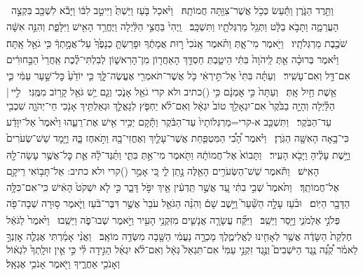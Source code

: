 \documentclass[12pt]{article}
\newcommand{\loc}[1]{\textsuperscript{\locf{#1}}}
\begin{document}
{\loc{ ו}~}‏וַתֵּ֖רֶד הַגֹּ֑רֶן וַתַּ֕עַשׂ כְּכֹ֥ל אֲשֶׁר־צִוַּ֖תָּה חֲמוֹתָֽהּ׃
{\loc{ ז}~}‏וַיֹּ֨אכַל בֹּ֤עַז וַיֵּשְׁתְּ֙ וַיִּיטַ֣ב לִבּ֔וֹ וַיָּבֹ֕א לִשְׁכַּ֖ב בִּקְצֵ֣ה הָעֲרֵמָ֑ה וַתָּבֹ֣א בַלָּ֔ט וַתְּגַ֥ל מַרְגְּלֹתָ֖יו וַתִּשְׁכָּֽב׃
{\loc{ ח}~}‏וַֽיְהִי֙ בַּחֲצִ֣י הַלַּ֔יְלָה וַיֶּחֱרַ֥ד הָאִ֖ישׁ וַיִּלָּפֵ֑ת וְהִנֵּ֣ה אִשָּׁ֔ה שֹׁכֶ֖בֶת מַרְגְּלֹתָֽיו׃
{\loc{ ט}~}‏וַיֹּ֖אמֶר מִי־אָ֑תְּ וַתֹּ֗אמֶר אָֽנֹכִי֙ ר֣וּת אֲמָתֶ֔ךָ וּפָרַשְׂתָּ֤ כְנָפֶ֙ךָ֙ עַל־אֲמָ֣תְךָ֔ כִּ֥י גֹאֵ֖ל אָֽתָּה׃
{\loc{ י}~}‏וַיֹּ֗אמֶר בְּרוּכָ֨ה אַ֤תְּ לַֽיהֹוָה֙ בִּתִּ֔י הֵיטַ֛בְתְּ חַסְדֵּ֥ךְ הָאַחֲר֖וֹן מִן־הָרִאשׁ֑וֹן לְבִלְתִּי־לֶ֗כֶת אַֽחֲרֵי֙ הַבַּ֣חוּרִ֔ים אִם־דַּ֖ל וְאִם־עָשִֽׁיר׃
{\loc{ יא}~}‏וְעַתָּ֗ה בִּתִּי֙ אַל־תִּ֣ירְאִ֔י כֹּ֥ל אֲשֶׁר־תֹּאמְרִ֖י אֶעֱשֶׂה־לָּ֑ךְ כִּ֤י יוֹדֵ֙עַ֙ כׇּל־שַׁ֣עַר עַמִּ֔י כִּ֛י אֵ֥שֶׁת חַ֖יִל אָֽתְּ׃
{\loc{ יב}~}‏וְעַתָּה֙ כִּ֣י אׇמְנָ֔ם כִּ֥י (){כתיב ולא קרי} גֹאֵ֖ל אָנֹ֑כִי וְגַ֛ם יֵ֥שׁ גֹּאֵ֖ל קָר֥וֹב מִמֶּֽנִּי׃
{\loc{ יג}~}‏לִ֣י{\Large }י |  הַלַּ֗יְלָה וְהָיָ֤ה בַבֹּ֙קֶר֙ אִם־יִגְאָלֵ֥ךְ טוֹב֙ יִגְאָ֔ל וְאִם־לֹ֨א יַחְפֹּ֧ץ לְגָאֳלֵ֛ךְ וּגְאַלְתִּ֥יךְ אָנֹ֖כִי חַי־יְהֹוָ֑ה שִׁכְבִ֖י עַד־הַבֹּֽקֶר׃
{\loc{ יד}~}‏וַתִּשְׁכַּ֤ב א-קרי=מַרְגְּלוֹתָיו֙ עַד־הַבֹּ֔קֶר וַתָּ֕קׇם  יַכִּ֥יר אִ֖ישׁ אֶת־רֵעֵ֑הוּ וַיֹּ֙אמֶר֙ אַל־יִוָּדַ֔ע כִּי־בָ֥אָה הָאִשָּׁ֖ה הַגֹּֽרֶן׃
{\loc{ טו}~}‏וַיֹּ֗אמֶר הָ֠בִ֠י הַמִּטְפַּ֧חַת אֲשֶׁר־עָלַ֛יִךְ וְאֶחֳזִי־בָ֖הּ וַתֹּ֣אחֶז בָּ֑הּ וַיָּ֤מׇד שֵׁשׁ־שְׂעֹרִים֙ וַיָּ֣שֶׁת עָלֶ֔יהָ וַיָּבֹ֖א הָעִֽיר׃
{\loc{ טז}~}‏וַתָּבוֹא֙ אֶל־חֲמוֹתָ֔הּ וַתֹּ֖אמֶר מִי־אַ֣תְּ בִּתִּ֑י וַתַּ֨גֶּד־לָ֔הּ אֵ֛ת כׇּל־אֲשֶׁ֥ר עָשָׂה־לָ֖הּ הָאִֽישׁ׃
{\loc{ יז}~}‏וַתֹּ֕אמֶר שֵׁשׁ־הַשְּׂעֹרִ֥ים הָאֵ֖לֶּה נָ֣תַן לִ֑י כִּ֚י אָמַ֣ר (){קרי ולא כתיב: } אַל־תָּב֥וֹאִי רֵיקָ֖ם אֶל־חֲמוֹתֵֽךְ׃
{\loc{ יח}~}‏וַתֹּ֙אמֶר֙ שְׁבִ֣י בִתִּ֔י עַ֚ד אֲשֶׁ֣ר תֵּֽדְעִ֔ין אֵ֖יךְ יִפֹּ֣ל דָּבָ֑ר כִּ֣י לֹ֤א יִשְׁקֹט֙ הָאִ֔ישׁ כִּֽי־אִם־כִּלָּ֥ה הַדָּבָ֖ר הַיּֽוֹם׃
\ledsidenote{{\loc{ד פרק}}}
{\loc{ א}~}‏וּבֹ֨עַז עָלָ֣ה הַשַּׁ֘עַר֮ וַיֵּ֣שֶׁב שָׁם֒ וְהִנֵּ֨ה הַגֹּאֵ֤ל עֹבֵר֙ אֲשֶׁ֣ר דִּבֶּר־בֹּ֔עַז וַיֹּ֛אמֶר ס֥וּרָה שְׁבָה־פֹּ֖ה פְּלֹנִ֣י אַלְמֹנִ֑י וַיָּ֖סַר וַיֵּשֵֽׁב׃
{\loc{ ב}~}‏וַיִּקַּ֞ח עֲשָׂרָ֧ה אֲנָשִׁ֛ים מִזִּקְנֵ֥י הָעִ֖יר וַיֹּ֣אמֶר שְׁבוּ־פֹ֑ה וַיֵּשֵֽׁבוּ׃
{\loc{ ג}~}‏וַיֹּ֙אמֶר֙ לַגֹּאֵ֔ל חֶלְקַת֙ הַשָּׂדֶ֔ה אֲשֶׁ֥ר לְאָחִ֖ינוּ לֶאֱלִימֶ֑לֶךְ מָכְרָ֣ה נָעֳמִ֔י הַשָּׁ֖בָה מִשְּׂדֵ֥ה מוֹאָֽב׃
{\loc{ ד}~}‏וַאֲנִ֨י אָמַ֜רְתִּי אֶגְלֶ֧ה אׇזְנְךָ֣ לֵאמֹ֗ר קְ֠נֵ֠ה נֶ֥גֶד הַיֹּשְׁבִים֮ וְנֶ֣גֶד זִקְנֵ֣י עַמִּי֒ אִם־תִּגְאַל֙ גְּאָ֔ל וְאִם־לֹ֨א יִגְאַ֜ל הַגִּ֣ידָה לִּ֗י  כִּ֣י אֵ֤ין זוּלָֽתְךָ֙ לִגְא֔וֹל וְאָנֹכִ֖י אַחֲרֶ֑יךָ וַיֹּ֖אמֶר אָנֹכִ֥י אֶגְאָֽל׃
\end{document}
